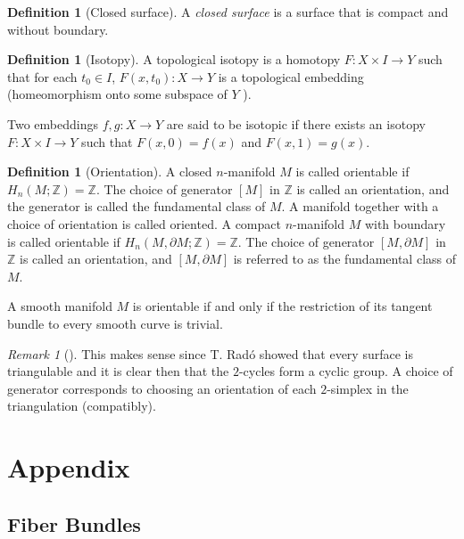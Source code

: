 \documentclass[reqno]{amsart}
\theoremstyle{definition}
\newtheorem{definition}[theorem]{Definition}
\theoremstyle{remark}
\newtheorem*{remark}{Remark}
\begin{document}
\begin{definition}[Closed surface]
    A \textit{closed surface} is a surface that is compact
    and without boundary.
\end{definition}

\begin{definition}[Isotopy]
    A topological isotopy is a homotopy
    $F \colon X \times I \to Y$ such that for each $t_0 \in I$,
    $F(x,t_0) \colon X \to Y$ is a topological embedding (homeomorphism onto
    some subspace of $Y$ ).

    Two embeddings $f,g \colon X \to Y$ are said to be
    isotopic if there exists an isotopy $F \colon X \times I
    \to Y$ such that $F(x,0) = f(x)$ and $F(x,1) = g(x)$.
\end{definition}


\begin{definition}[Orientation]
    A closed $n$-manifold $M$ is called orientable
    if $H_n \left( M ; \mathbb{Z} \right) = \mathbb{Z}$.
    The choice of generator $\left[ M \right] $ in
    $\mathbb{Z}$ is called an orientation, and the generator
    is called the fundamental class of $M$. A manifold
    together with a choice of orientation is
    called oriented. A compact $n$-manifold $M$ with
    boundary is called orientable if
    $H_n \left( M, \partial M ; \mathbb{Z} \right) = \mathbb{Z}$.
    The choice of generator $\left[ M, \partial M \right] $ in
    $\mathbb{Z}$ is called an orientation, and
    $\left[ M, \partial M \right] $ is referred to as
    the fundamental class of $M$.

    A smooth manifold $M$ is orientable if and only if
    the restriction of its tangent bundle to every smooth
    curve is trivial.

    \begin{remark}[]
        This makes sense since T. Radó showed that every surface
        is triangulable and it is clear then that the $2$-cycles
        form a cyclic group. A choice of generator corresponds
        to choosing an orientation of each $2$-simplex in the
        triangulation (compatibly).
    \end{remark}
\end{definition}


\section{Appendix}

\subsection{Fiber Bundles}
\end{document}
